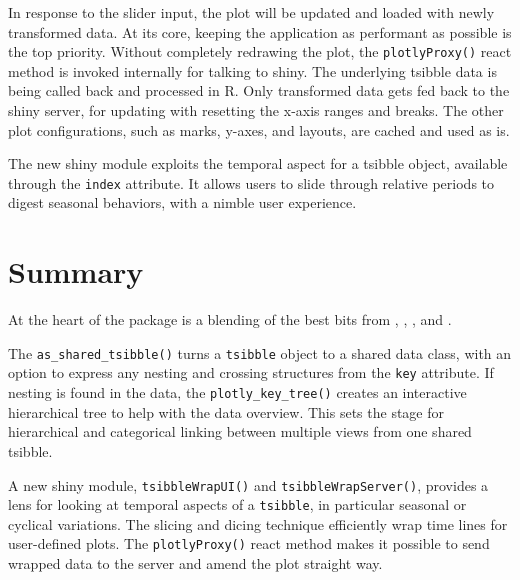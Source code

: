 In response to the slider input, the plot will be updated and loaded
with newly transformed data. At its core, keeping the application as
performant as possible is the top priority. Without completely redrawing
the plot, the \texttt{plotlyProxy()} react method is invoked internally
for talking to shiny. The underlying tsibble data is being called back
and processed in R. Only transformed data gets fed back to the shiny
server, for updating with resetting the x-axis ranges and breaks. The
other plot configurations, such as marks, y-axes, and layouts, are
cached and used as is.

The new shiny module exploits the temporal aspect for a tsibble object,
available through the \texttt{index} attribute. It allows users to slide
through relative periods to digest seasonal behaviors, with a nimble
user experience.

\hypertarget{summary}{%
\section{Summary}\label{summary}}

At the heart of the  package is a blending of the
best bits from , , ,
and .

The \texttt{as\_shared\_tsibble()} turns a \texttt{tsibble} object to a
shared data class, with an option to express any nesting and crossing
structures from the \texttt{key} attribute. If nesting is found in the
data, the \texttt{plotly\_key\_tree()} creates an interactive
hierarchical tree to help with the data overview. This sets the stage
for hierarchical and categorical linking between multiple views from one
shared tsibble.

A new shiny module, \texttt{tsibbleWrapUI()} and
\texttt{tsibbleWrapServer()}, provides a lens for looking at temporal
aspects of a \texttt{tsibble}, in particular seasonal or cyclical
variations. The slicing and dicing technique efficiently wrap time lines
for user-defined plots. The \texttt{plotlyProxy()} react method makes it
possible to send wrapped data to the server and amend the plot straight
way.



\address{%
Earo Wang\\
The University of Auckland\\%
Department of Statistics\\
%
%
\textit{ORCiD: \href{https://orcid.org/0000-0001-6448-5260}{0000-0001-6448-5260}}\\%
\href{mailto:earo.wang@auckland.ac.nz}{\nolinkurl{earo.wang@auckland.ac.nz}}%
}

\address{%
Dianne Cook\\
Monash University\\%
Department of Econometrics and Business Statistics\\
%
%
\textit{ORCiD: \href{https://orcid.org/0000-0002-3813-7155}{0000-0002-3813-7155}}\\%
\href{mailto:dicook@monash.edu}{\nolinkurl{dicook@monash.edu}}%
}
